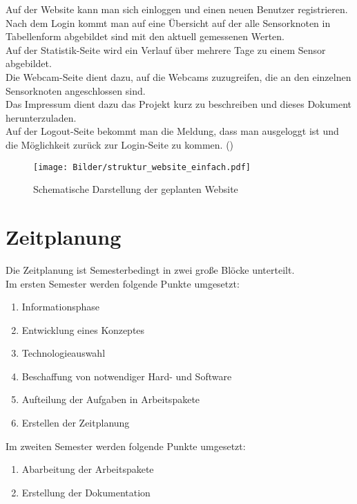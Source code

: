 Auf der Website kann man sich einloggen und einen neuen Benutzer registrieren.
Nach dem Login kommt man auf eine Übersicht auf der alle Sensorknoten in
Tabellenform abgebildet sind mit den aktuell gemessenen Werten. \\
Auf der Statistik-Seite wird ein Verlauf über mehrere Tage zu einem Sensor
abgebildet.\\
Die Webcam-Seite dient dazu, auf die Webcams zuzugreifen, die an den einzelnen Sensorknoten
angeschlossen sind.\\
Das Impressum dient dazu das Projekt kurz zu beschreiben und dieses Dokument
herunterzuladen.\\
Auf der Logout-Seite bekommt man die Meldung, dass man ausgeloggt ist und die
Möglichkeit zurück zur Login-Seite zu kommen.
()


\begin{figure} [htb]
\begin{centering}
\texttt{[image: Bilder/struktur\_website\_einfach.pdf]}
\caption[Schematische Darstellung der geplanten Website]{Schematische
Darstellung der geplanten Website}
\label{Darstellung_Website_einfach}
\end{centering}
\end{figure}



\section{Zeitplanung}

Die Zeitplanung ist Semesterbedingt in zwei große Blöcke unterteilt.\\
Im ersten Semester werden folgende Punkte umgesetzt:

\begin{enumerate}
  \item Informationsphase
  \item Entwicklung eines Konzeptes
  \item Technologieauswahl
  \item Beschaffung von notwendiger Hard- und Software
  \item Aufteilung der Aufgaben in Arbeitspakete
  \item Erstellen der Zeitplanung
\end{enumerate}

Im zweiten Semester werden folgende Punkte umgesetzt:

\begin{enumerate}
  \item Abarbeitung der Arbeitspakete
  \item Erstellung der Dokumentation
\end{enumerate}

